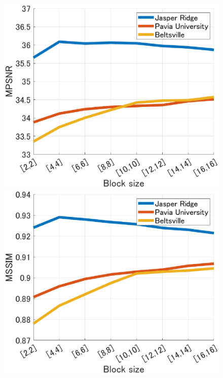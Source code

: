 \begin{figure}[t]
    \begin{center}
        \begin{minipage}{0.240\hsize}
            \centerline{\includegraphics[width=\hsize]{./fig_Param_Anal/blocksize_mpsnr.eps}}
        \end{minipage}
        \begin{minipage}{0.240\hsize}
            \centerline{\includegraphics[width=\hsize]{./fig_Param_Anal/blocksize_mssim.eps}}

\end{minipage}
\end{center}
\end{figure}
